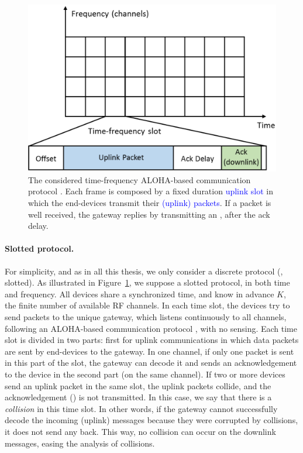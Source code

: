 \begin{figure}[!h]
    \centering
    \includegraphics[scale=0.40]{protocol.eps}
    \caption[The considered time-frequency slotted protocol. Each frame is composed by a fixed duration uplink slot in which the end-devices transmit their (uplink) packets. If a packet is well received, the gateway replies by transmitting an \Ack, after the ack delay.]{The considered time-frequency ALOHA-based communication protocol \cite{Abramson1970,Roberts75}. Each frame is composed by a fixed duration \textcolor{blue}{uplink slot} in which the end-devices transmit their \textcolor{blue}{(uplink) packets}. If a packet is well received, the gateway replies by transmitting an \textcolor{darkgreen}{\Ack}, after the ack delay.}
    \label{fig:41:protocol}
\end{figure}


\paragraph{Slotted protocol.}
%
For simplicity, and as in all this thesis, we only consider a discrete protocol (\ie, slotted).
As illustrated in Figure~\ref{fig:41:protocol}, we suppose a slotted protocol, in both time and frequency.
All devices share a synchronized time, and know in advance $K$, the finite number of available RF channels.
In each time slot, the devices try to send packets to the unique gateway, which listens continuously to all channels, following an ALOHA-based communication protocol \cite{Abramson1970,Roberts75}, with no sensing.
Each time slot is divided in two parts: first for uplink communications in which data packets are sent by end-devices to the gateway.
In one channel, if only one packet is sent in this part of the slot, the gateway can decode it and sends an acknowledgement to the device in the second part (on the same channel).
If two or more devices send an uplink packet in the same slot, the uplink packets collide, and the acknowledgement (\Ack) is not transmitted. In this case, we say that there is a \emph{collision} in this time slot.
In other words, if the gateway cannot successfully decode the incoming (uplink) messages because they were corrupted by collisions, it does not send any \Ack{} back.
This way, no collision can occur on the downlink messages, easing the analysis of collisions.


